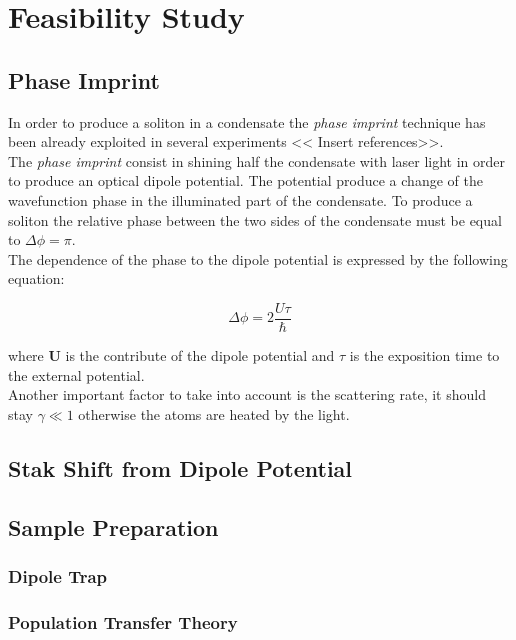 \documentclass[../main.tex]{subfiles}
\begin{document}
\chapter{Feasibility Study}

\section{Phase Imprint}

In order to produce a soliton in a condensate the \textit{phase imprint} technique has been already exploited in several experiments << Insert references>>.\\
The \textit{phase imprint} consist in shining half the condensate with laser light in order to produce an optical dipole potential. The potential produce a change of the wavefunction phase in the illuminated part of the condensate. To produce a soliton the relative phase between the two sides of the condensate must be equal to $\Delta \phi = \pi$.\\
The dependence of the phase to the dipole potential is expressed by the following equation:

\begin{equation}
\Delta \phi = 2 \frac{U \tau}{\hbar}
\end{equation}

where \textbf{U} is the contribute of the dipole potential and $\tau$ is the exposition time to the external potential.\\
Another important factor to take into account is the scattering rate, it should stay $\gamma \ll 1$ otherwise the atoms are heated by the light. 


\section{Stak Shift from Dipole Potential}


\section{Sample Preparation}

\subsection{Dipole Trap}

\subsection{Population Transfer Theory}
\end{document}
